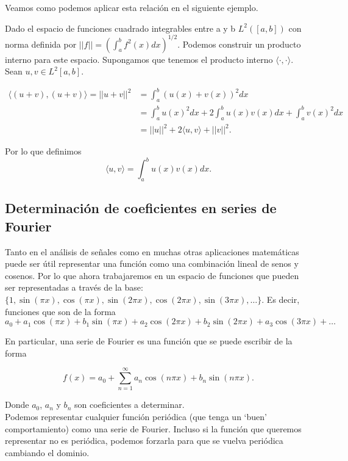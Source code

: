 \documentclass[12pt]{book}
\begin{document}
Veamos como podemos aplicar esta relación en el siguiente ejemplo.\\
\begin{exampleenv}
Dado el espacio de funciones cuadrado integrables entre a y b $L^2([a,b])$ con norma definida por $||f||=(\int_a^bf^2(x)dx)^{1/2}$. Podemos construir un producto interno para este espacio. Supongamos que tenemos el producto interno $\langle \cdot,\cdot \rangle$. Sean $u,v\in L^2[a,b]$.

\begin{align*}
    \langle(u+v),(u+v)\rangle=||u+v||^2&=\int_a^b (u(x)+v(x))^2dx\\
    &=\int _a^b u(x)^2dx+2\int_a^b u(x)v(x)dx+\int_a^b v(x)^2dx\\
    &=||u||^2+2\langle u,v\rangle + ||v||^2.
\end{align*}

Por lo que definimos 
\[
    \langle u,v\rangle =\int_a^b u(x)v(x)dx.
\]
\end{exampleenv}
\subsection{Determinación de coeficientes en series de Fourier}
\noindent
Tanto en el análisis de señales como en muchas otras aplicaciones matemáticas puede ser útil representar una función como una combinación lineal de senos y cosenos. Por lo que ahora trabajaremos en un espacio de funciones que pueden ser representadas a través de la base: $\{1,\sin(\pi x),\cos(\pi x), \sin(2\pi x), \cos(2\pi x), \sin(3\pi x),\dots\}$. Es decir, funciones que son de la forma
\[
    a_0+a_1\cos(\pi x)+b_1\sin(\pi x)+a_2\cos(2\pi x)+b_2\sin(2\pi x)+a_3\cos(3\pi x)+\dots
\]

En particular, una serie de Fourier es una función que se puede escribir de la forma

\[
    f(x)=a_0+\sum_{n=1}^\infty a_n\cos(n\pi x)+b_n\sin(n\pi x).
\]

Donde $a_0$, $a_n$ y $b_n$ son coeficientes a determinar.\\

Podemos representar cualquier función periódica (que tenga un `buen' comportamiento) como una serie de Fourier. Incluso si la función que queremos representar no es periódica, podemos forzarla para que se vuelva periódica cambiando el dominio.
\end{document}
